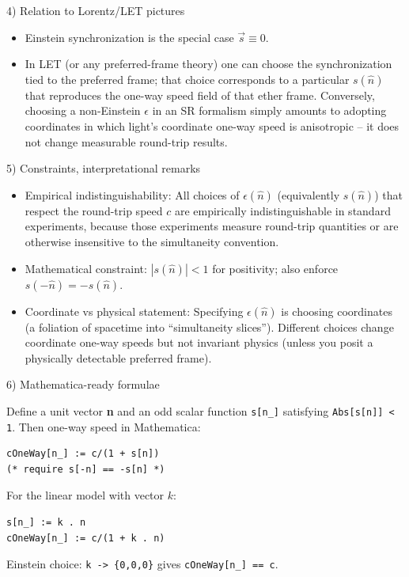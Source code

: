 \documentclass[a4paper]{article}
\theoremstyle{plain}
\theoremstyle{definition}
\newcommand{\vect}[1]{\vec{#1}}
\newcommand{\hatvec}[1]{\hat{#1}}
\begin{document}
4) Relation to Lorentz/LET pictures

\begin{itemize}
\item Einstein synchronization is the special case $\vect{s} \equiv
  0$.
\item In LET (or any preferred-frame theory) one can choose the
  synchronization tied to the preferred frame; that choice corresponds
  to a particular $s(\hatvec{n})$ that reproduces the one-way speed
  field of that ether frame.  Conversely, choosing a non-Einstein
  $\epsilon$ in an SR formalism simply amounts to adopting coordinates
  in which light's coordinate one-way speed is anisotropic -- it does
  not change measurable round-trip results.
\end{itemize}

5) Constraints, interpretational remarks

\begin{itemize}
\item Empirical indistinguishability: All choices of
  $\epsilon(\hatvec{n})$ (equivalently $s(\hatvec{n})$) that respect
  the round-trip speed $c$ are empirically indistinguishable in
  standard experiments, because those experiments measure round-trip
  quantities or are otherwise insensitive to the simultaneity
  convention.
\item Mathematical constraint: $|s(\hatvec{n})| < 1$ for positivity;
  also enforce $s(-\hatvec{n}) = -s(\hatvec{n})$.
\item Coordinate vs physical statement: Specifying
  $\epsilon(\hatvec{n})$ is choosing coordinates (a foliation of
  spacetime into ``simultaneity slices'').  Different choices change
  coordinate one-way speeds but not invariant physics (unless you
  posit a physically detectable preferred frame).
\end{itemize}

6) Mathematica-ready formulae

Define a unit vector \textbf{n} and an odd scalar function
\verb|s[n_]| satisfying \verb|Abs[s[n]] < 1|.  Then one-way
speed in Mathematica:
\begin{verbatim}
cOneWay[n_] := c/(1 + s[n])
(* require s[-n] == -s[n] *)
\end{verbatim}
For the linear model with vector $k$:
\begin{verbatim}
s[n_] := k . n
cOneWay[n_] := c/(1 + k . n)
\end{verbatim}
Einstein choice: \verb|k -> {0,0,0}| gives \verb|cOneWay[n_] == c|.
\end{document}

